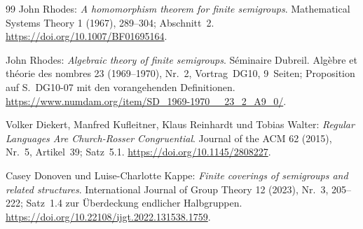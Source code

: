 \begin{thebibliography}{99}
John Rhodes: \emph{A homomorphism theorem for finite semigroups}.
Mathematical Systems Theory 1 (1967), 289--304; Abschnitt~2.
\url{https://doi.org/10.1007/BF01695164}.

John Rhodes: \emph{Algebraic theory of finite semigroups}.
Séminaire Dubreil. Algèbre et théorie des nombres 23 (1969--1970),
Nr.~2, Vortrag~DG10, 9~Seiten;
Proposition auf S.~DG10-07 mit den vorangehenden Definitionen.
\url{https://www.numdam.org/item/SD_1969-1970__23_2_A9_0/}.

Volker Diekert, Manfred Kufleitner, Klaus Reinhardt und Tobias Walter:
\emph{Regular Languages Are Church-Rosser Congruential}.
Journal of the ACM 62 (2015), Nr.~5, Artikel~39; Satz~5.1.
\url{https://doi.org/10.1145/2808227}.

Casey Donoven und Luise-Charlotte Kappe:
\emph{Finite coverings of semigroups and related structures}.
International Journal of Group Theory 12 (2023), Nr.~3, 205--222;
Satz~1.4 zur Überdeckung endlicher Halbgruppen.
\url{https://doi.org/10.22108/ijgt.2022.131538.1759}.
\end{thebibliography}
